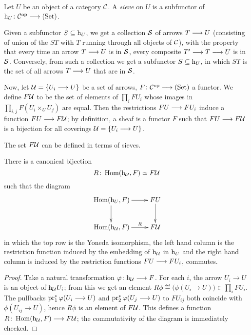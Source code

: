 \begin{2   CONTRAVARIANT FUNCTORS}
\begin{2.3 Sheaves in Grothendieck topologies}
\begin{definition}
Let $U$ be an object of a category $\mathcal{C}$. A \emph{sieve} on $U$ is a subfunctor of $\h_{U} \colon \cC\op \arr \catset$.
\end{definition}

Given a subfunctor $S \subseteq \mathrm{h}_{U}$, we get a collection $\mathcal{S}$ of arrows $T \arr U$ (consisting of union of the $ST$  with $T$ running through all objects of $\mathcal{C}$), with the property that every time an arrow $T \arr U$ is in $\mathcal{S}$, every composite $T' \arr T \arr U$ is in $\mathcal{S}$. Conversely, from such a collection we get a subfunctor $S \subseteq \mathrm{h}_{U}$, in which $ST$ is the set of all arrows $T \arr U$ that are in $\mathcal{S}$.

Now, let $\mathcal{U} = \{U_{i} \longrightarrow U\}$ be a set of arrows, $F \colon \cC\op \arr \catset$ a functor. We define $F\mathcal{U}$ to be the set of elements of $\prod_i FU_i$ whose images in $\prod_{i,j} F(U_i \times_U U_j)$ are equal. Then the restrictions $FU \arr FU_i$ induce a function $FU \arr F\cU$; by definition, a sheaf is a functor $F$ such that $FU \arr F\cU$ is a bijection for all coverings $\mathcal{U} = \{U_{i} \longrightarrow U\}$.

The set $F\mathcal{U}$ can be defined in terms of sieves.

\begin{proposition}\label{prop:funnychar-gluing}
There is a canonical bijection 
   \[
   R \colon \operatorname{Hom}(\mathrm{h}_{\mathcal{U}}, F) \simeq F\mathcal{U}
   \]
such that the diagram
   \[
   \xymatrix{
   {}\hom(\h_{U}, F)   \ar[r]\ar[d]  & FU \ar[d] \\
   {}\hom(\h_{\cU}, F) \ar[r]^-{R} & F\cU
   }
   \]
in which the top row is the Yoneda isomorphism, the left hand column is the restriction function induced by the embedding of $\mathrm{h}_{\mathcal{U}}$ in $\mathrm{h}_{U}$ and the right hand column is induced by the restriction functions $FU \arr FU_{i}$, commutes.
\end{proposition}

\begin{proof}
Take a natural transformation $\phi\colon \h_{\cU} \arr F$. For each $i$, the arrow $U_{i} \to U$ is an object of $\mathrm{h}_{\mathcal{U}}U_{i}$; from this we get an element $R\phi \eqdef \bigl(\phi(U_{i} \to U)\bigr) \in \prod_i FU_i$. The pullbacks $\operatorname{pr}_{1}^{*} \varphi(U_{i} \longrightarrow U)$ and $\operatorname{pr}_{2}^{*} \varphi(U_{j} \longrightarrow U)$ to $FU_{ij}$ both coincide with $\phi(U_{ij} \to U)$, hence $R\phi$ is an element of $F\mathcal{U}$. This defines a function $R \colon \hom(\h_{\cU}, F) \arr F\cU$; the commutativity of the diagram is immediately checked.


\end{proof}
\end{2.3 Sheaves in Grothendieck topologies}
\end{2   CONTRAVARIANT FUNCTORS}
